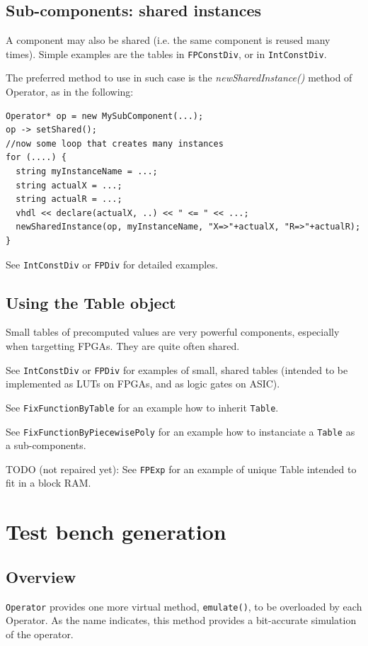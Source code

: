 \documentclass{article}
\begin{document}
\subsection{Sub-components: shared instances}

A component may also be shared (i.e. the same component is reused many times).
Simple examples are the tables in \texttt{FPConstDiv}, or in \texttt{IntConstDiv}.

The preferred method to use in such case is the \emph{newSharedInstance()} method of Operator, as in the following:
\begin{verbatim}
Operator* op = new MySubComponent(...);
op -> setShared();
//now some loop that creates many instances
for (....) {
  string myInstanceName = ...; 
  string actualX = ...;
  string actualR = ...;
  vhdl << declare(actualX, ..) << " <= " << ...;   
  newSharedInstance(op, myInstanceName, "X=>"+actualX, "R=>"+actualR);
}
\end{verbatim}

See \texttt{IntConstDiv} or \texttt{FPDiv} for detailed examples.

\subsection{Using the Table object}
Small tables of precomputed values are very powerful components, especially when targetting FPGAs.
They are quite often shared.

See \texttt{IntConstDiv} or \texttt{FPDiv} for examples of small, shared tables (intended to be implemented as LUTs on FPGAs, and as logic gates on ASIC).

See \texttt{FixFunctionByTable} for an example how to inherit \texttt{Table}.

See \texttt{FixFunctionByPiecewisePoly} for an example how to instanciate a \texttt{Table} as a sub-components.

TODO (not repaired yet): See \texttt{FPExp} for an example of unique Table intended to fit in a block RAM.


\section{Test bench generation}\label{sec:test-bench-gener}

\subsection{Overview}
\texttt{\small Operator} provides one more virtual method, \texttt{\small emulate()},
to be overloaded by each Operator. As the name indicates, this method
provides a bit-accurate simulation of the operator.
 
\end{document}
